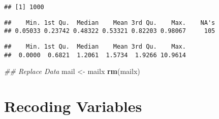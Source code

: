 \documentclass[
]{article}
\newenvironment{Shaded}{\begin{snugshade}}{\end{snugshade}}
\newcommand{\CommentTok}[1]{\textcolor[rgb]{0.56,0.35,0.01}{\textit{#1}}}
\newcommand{\KeywordTok}[1]{\textcolor[rgb]{0.13,0.29,0.53}{\textbf{#1}}}
\newcommand{\NormalTok}[1]{#1}
\newcommand{\OperatorTok}[1]{\textcolor[rgb]{0.81,0.36,0.00}{\textbf{#1}}}
\newcommand{\StringTok}[1]{\textcolor[rgb]{0.31,0.60,0.02}{#1}}
\begin{document}
\begin{verbatim}
## [1] 1000
\end{verbatim}

\begin{Shaded}
\end{Shaded}

\begin{verbatim}
##    Min. 1st Qu.  Median    Mean 3rd Qu.    Max.    NA's 
## 0.05033 0.23742 0.48322 0.53321 0.82203 0.98067     105
\end{verbatim}

\begin{Shaded}
\end{Shaded}

\begin{verbatim}
##    Min. 1st Qu.  Median    Mean 3rd Qu.    Max. 
##  0.0000  0.6821  1.2061  1.5734  1.9266 10.9614
\end{verbatim}

\begin{Shaded}
\begin{Highlighting}[]
\CommentTok{## Replace Data}
\NormalTok{mail <-}\StringTok{ }\NormalTok{mailx}
\KeywordTok{rm}\NormalTok{(mailx)}
\end{Highlighting}
\end{Shaded}

\hypertarget{recoding-variables}{%
\section{Recoding Variables}\label{recoding-variables}}
\end{document}
